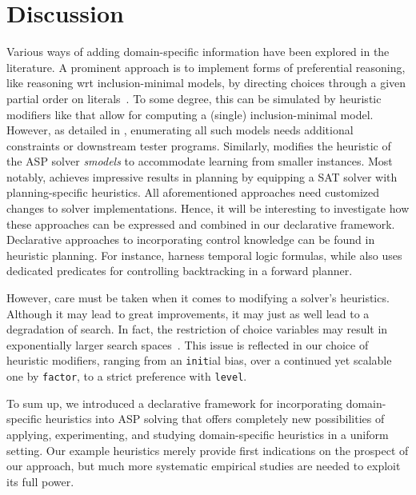 
\section{Discussion}\label{sec:discussion}

Various ways of adding domain-specific information have been explored in the literature.
%
A prominent approach is to implement forms of preferential reasoning, 
like reasoning wrt inclusion-minimal models, by directing choices through
a given partial order on literals~\cite{cacacale96a,rogima10a,giumar12a}.
%
To some degree, this can be simulated by heuristic modifiers like
that allow for computing a (single) inclusion-minimal model.
However, as detailed in \cite{rogima10a}, enumerating all such models needs additional constraints
or downstream tester programs.
Similarly,
\cite{balduccini11b} modifies the heuristic of the ASP solver \textit{smodels} to accommodate learning from smaller instances.
Most notably,
\cite{rintanen12a} achieves impressive results in planning by equipping a SAT solver with
planning-specific heuristics.
%
All aforementioned approaches need customized changes to solver implementations.
%
Hence, it will be interesting to investigate how these approaches can be expressed and combined in
our declarative framework.
%
Declarative approaches to incorporating control knowledge can be found in heuristic planning.
For instance, \cite{backab00a,huseka99a} harness temporal logic formulas, while \cite{sierra04a} also uses
dedicated predicates for controlling backtracking in a forward planner.

However,
care 
must be taken when it comes to modifying a solver's 
heuristics.
Although it may lead to great improvements, it may just as well lead to a degradation of search.
In fact, the restriction of choice variables may result in exponentially larger search spaces~\cite{jajuni05a}.
This issue is reflected in our choice of heuristic modifiers, 
ranging from an \texttt{init}ial bias,
over a continued yet scalable one by \texttt{factor},
to a strict preference with \texttt{level}.

To sum up,
we introduced a declarative framework for incorporating domain-specific heuristics into ASP solving
that 
offers completely new possibilities of applying, experimenting, and studying
domain-specific heuristics in a uniform setting.
Our example heuristics merely provide first indications on the prospect of our approach,
but much more systematic empirical studies are needed to exploit its full power.


